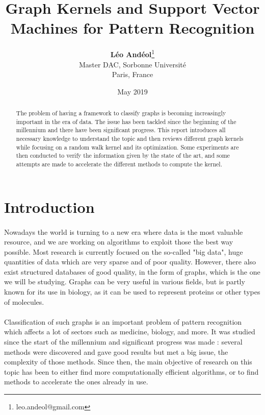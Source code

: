 \documentclass{article}
\title{Graph Kernels and Support Vector Machines for Pattern Recognition}
\author{\textbf{Léo Andéol}\thanks{leo.andeol@gmail.com}\\ Master DAC, Sorbonne Université\\ Paris, France}
\date{May 2019}
\theoremstyle{definition}
\begin{document}
\maketitle
\begin{abstract}
	The problem of having a framework to classify graphs is becoming increasingly important in the era of data. The issue has been tackled since the beginning of the millennium and there have been significant progress. This report introduces all necessary knowledge to understand the topic and then reviews different graph kernels while focusing on a random walk kernel and its optimization. Some experiments are then conducted to verify the information given by the state of the art, and some attempts are made to accelerate the different methods to compute the kernel.  
\end{abstract}

\newpage

\tableofcontents

\newpage

\section{Introduction}
 \paragraph{}Nowadays the world is turning to a new era where data is the most valuable resource, and we are working on algorithms to exploit those the best way possible. Most research is currently focused on the so-called "big data", huge quantities of data which are very sparse and of poor quality. However, there also exist structured databases of good quality, in the form of graphs, which is the one we will be studying. Graphs can be very useful in various fields, but is partly known for its use in biology, as it can be used to represent proteins or other types of molecules.
 \paragraph{}Classification of such graphs is an important problem of pattern recognition which affects a lot of sectors such as medicine, biology, and more. It was studied since the start of the millennium and significant progress was made : several methods were discovered and gave good results but met a big issue, the complexity of those methods. Since then, the main objective of research on this topic has been to either find more computationally efficient algorithms, or to find methods to accelerate the ones already in use.
\end{document}
